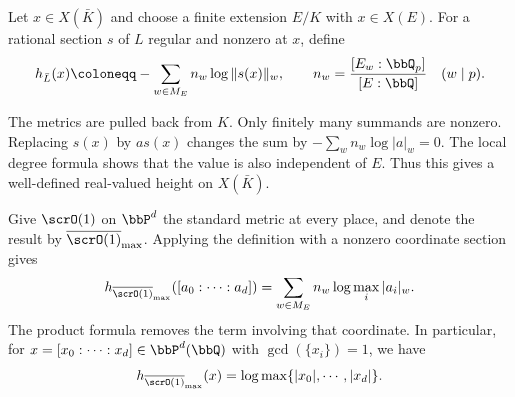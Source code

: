 \begin{definition}[label=\labelNFM{def:height-of-an-algebraic-point}, status=draft, tag=0000000]
	Let $x \in X(\bar K)$ and choose a finite extension $E/K$ with $x \in X(E)$.
	For a rational section $s$ of $L$ regular and nonzero at $x$, define
	\[ h_{\bar L}(x) \coloneqq -\sum_{w \in M_E}n_w\log\|s(x)\|_w, \qquad n_w = \frac{[E_w:\bbQ_p]}{[E:\bbQ]} \quad (w \mid p). \]
\end{definition}

\Yang{}
The metrics are pulled back from $K$.
\Yang{}
Only finitely many summands are nonzero.
Replacing $s(x)$ by $a s(x)$ changes the sum by $-\sum_w n_w\log|a|_w = 0$.
The local degree formula shows that the value is also independent of $E$.
Thus this gives a well-defined real-valued height on $X(\bar K)$.
\Yang{}

\begin{example}[label=\labelNFM{eg:standard-logarithmic-height}, status=draft, tag=0000000]
	Give $\scrO(1)$ on $\bbP^d$ the standard metric at every place, and denote the result by $\overline{\scrO(1)}_{\max}$.
	Applying the definition with a nonzero coordinate section gives
	\[ h_{\overline{\scrO(1)}_{\max}}([a_0:\cdots:a_d]) = \sum_{w \in M_E}n_w\log\max_i|a_i|_w. \]
	The product formula removes the term involving that coordinate.
	In particular, for $x = [x_0:\cdots:x_d] \in \bbP^d(\bbQ)$ with $\gcd(\{x_i\}) = 1$, we have
	\[  h_{\overline{\scrO(1)}_{\max}}(x) = \log \max\{|x_0|,\cdots,|x_d|\}. \]
\end{example}

